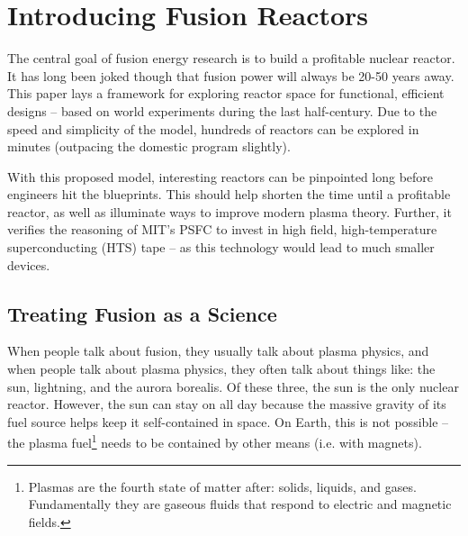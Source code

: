 %
%
%
%
%
%
%
%

\chapter{Introducing Fusion Reactors}

The central goal of fusion energy research is to build a profitable nuclear reactor. It has long been joked though that fusion power will always be 20-50 years away. This paper lays a framework for exploring reactor space for functional, efficient designs -- based on world experiments during the last half-century. Due to the speed and simplicity of the model, hundreds of reactors can be explored in minutes (outpacing the domestic program slightly).

With this proposed model, interesting reactors can be pinpointed long before engineers hit the blueprints. This should help shorten the time until a profitable reactor, as well as illuminate ways to improve modern plasma theory. Further, it verifies the reasoning of MIT's PSFC to invest in high field, high-temperature superconducting (HTS) tape -- as this technology would lead to much smaller devices.

\section{Treating Fusion as a Science}

When people talk about fusion, they usually talk about plasma physics, and when people talk about plasma physics, they often talk about things like: the sun, lightning, and the aurora borealis. Of these three, the sun is the only nuclear reactor. However, the sun can stay on all day because the massive gravity of its fuel source helps keep it self-contained in space. On Earth, this is not possible -- the plasma fuel\footnote{Plasmas are the fourth state of matter after: solids, liquids, and gases. Fundamentally they are gaseous fluids that respond to electric and magnetic fields.} needs to be contained by other means (i.e. with magnets).

